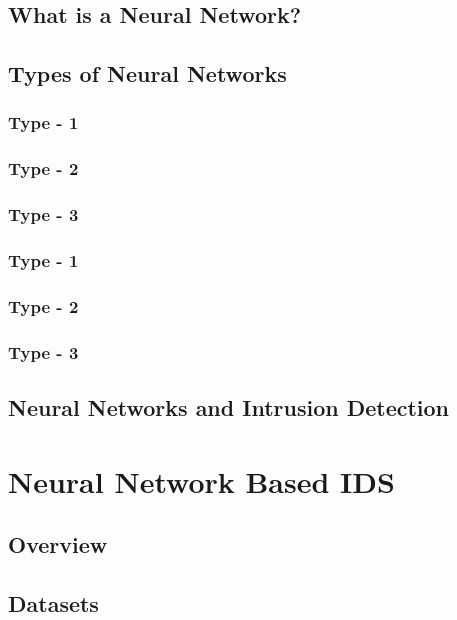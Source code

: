 \documentclass[12pt]{article}
\theoremstyle{definition}
\begin{document}
		\subsection{What is a Neural Network?}
		\lipsum[1-2]
		\subsection{Types of Neural Networks}
		\lipsum[1-2]
			\subsubsection{Type - 1}
			\lipsum[1-2]
			\subsubsection{Type - 2}
			\lipsum[1-2]
			\subsubsection{Type - 3}
			\lipsum[1-2]
			\subsubsection{Type - 1}
			\lipsum[1-2]
			\subsubsection{Type - 2}
			\lipsum[1-2]
			\subsubsection{Type - 3}
			\lipsum[1-2]
		\subsection{Neural Networks and Intrusion Detection}
		\lipsum[1-3]
	
	\cleardoublepage
	\section{Neural Network Based IDS}\label{sec:nn-based-ids}
		\lipsum[2]
		\subsection{Overview}
		\lipsum[2]
		
		\subsection{Datasets}
		
\end{document}
